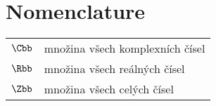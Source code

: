 \chapter*{Nomenclature}

\begin{flushleft}
\begin{longtable}[l]{ll} %
  $\Cbb$                 & množina všech komplexních čísel \\[1mm]
  $\Rbb$                 & množina všech reálných čísel \\[1mm]
  $\Zbb$                 & množina všech celých čísel \\[1mm]
\end{longtable}
\end{flushleft}
